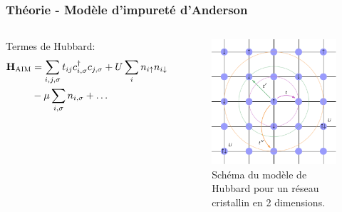 \begin{frame}
    \frametitle{Théorie - Modèle d'impureté d'Anderson}
    \begin{columns}
        Termes de Hubbard:
        {\scriptsize
        \begin{align*}
            \vb{H}_{\text{AIM}} &= \sum_{i,j,\sigma}t_{ij}c_{i,\sigma}^\dagger c_{j,\sigma} + U\sum_in_{i\uparrow}n_{i\downarrow} \\
                                &- \mu\sum_{i,\sigma}n_{i,\sigma} + \dots
        \end{align*}
        }
        \begin{figure}
           \centering
            \includegraphics[scale=0.95]{./figures/theory/2d_lattice.pdf}
            \caption{Schéma du modèle de Hubbard pour un réseau cristallin en 2 dimensions.}
            \label{fig: hubbard_2d}
        \end{figure}
    \end{columns}
\end{frame}

